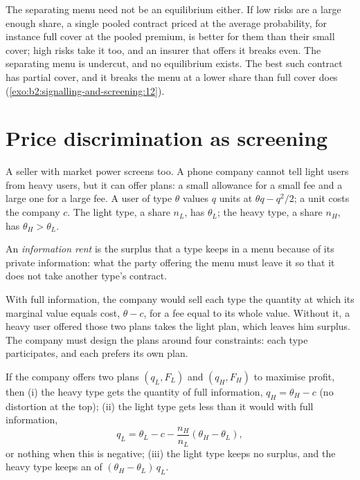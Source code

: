 The separating menu need not be an equilibrium either. If low risks are a large enough share, a single pooled contract
priced at the average probability, for instance full cover at the pooled premium, is better for them than their small
cover; high risks take it too, and an insurer that offers it breaks even. The separating menu is undercut, and no
equilibrium exists. The best such contract has partial cover, and it breaks the menu at a lower share than full cover does (\cref{exo:b2:signalling-and-screening:12}).

\section{Price discrimination as screening}\label{sec:b2:signalling-and-screening:pricing}

A seller with market power screens too. A phone company cannot tell light users from heavy users, but it can offer plans:
a small allowance for a small fee and a large one for a large fee. A user of type $\theta$ values $q$ units at $\theta q - q^2/2$; a unit
costs the company $c$. The light type, a share $n_L$, has $\theta_L$; the heavy type, a share $n_H$, has $\theta_H > \theta_L$.

\begin{definition}\label{def:b2:signalling-and-screening:information-rent}
An \emph{information rent} is the surplus that a type keeps in a  menu because of its
private information: what the party offering the menu must leave it so that it does not take another type's contract.
\end{definition}

With full information, the company would sell each type the quantity at which its marginal value equals cost, $\theta - c$, for
a fee equal to its whole value. Without it, a heavy user offered those two plans takes the light plan, which leaves him
surplus. The company must design the plans around four constraints: each type participates, and each prefers its own plan.

\begin{proposition}\label{prop:b2:signalling-and-screening:menu}
If the company offers two plans $(q_L, F_L)$ and $(q_H, F_H)$ to maximise profit, then (i) the heavy type gets the quantity of full
information, $q_H = \theta_H - c$ (no distortion at the top); (ii) the light type gets less than it would with full information,
\[
  q_L = \theta_L - c - \frac{n_H}{n_L}(\theta_H - \theta_L),
\]
or nothing when this is negative; (iii) the light type keeps no surplus, and the heavy type keeps an  of
$(\theta_H - \theta_L)\,q_L$.
\end{proposition}

